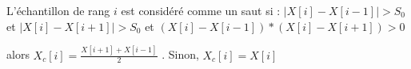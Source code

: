 L'\'echantillon de rang $i$ est consid\'er\'e comme un saut si :
$|X[i] - X[i-1]| > S_0$ et $|X[i] - X[i+1]| > S_0$  et $ (X[i] - X[i - 1]) * (X[i] - X[i + 1]) > 0$ 

alors $X_c[i] = \frac{X[i+1] + X[i-1]}{2}$ . Sinon, $X_c[i] = X[i]$
